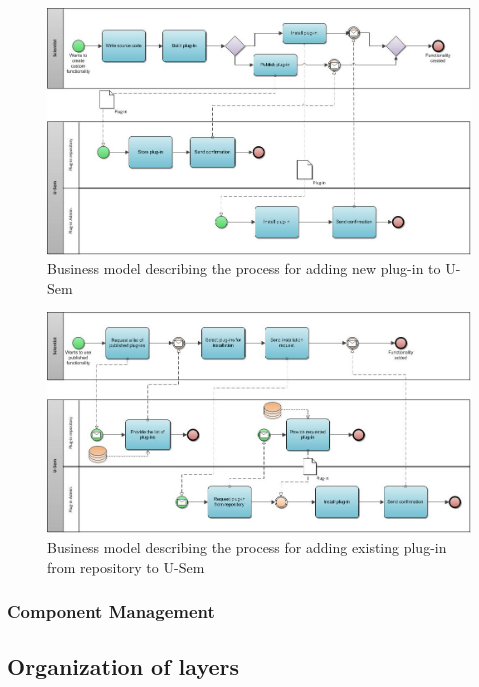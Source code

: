 \begin{figure}[h!]
  \centering
  	\includegraphics[scale=0.7,angle=90]{plug-in/business_processes/CreatePlugInBusinessModel.jpg}
  \caption{Business model describing the process for adding new plug-in to U-Sem}
\end{figure}

\begin{figure}[h!]
  \centering
  	\includegraphics[scale=0.7,angle=90]{plug-in/business_processes/InstallPlugInFromRepoBusinessModel.jpg}
  \caption{Business model describing the process for adding existing plug-in from repository to U-Sem}
\end{figure}

\subsubsection{Component Management}

\subsection{Organization of layers}

